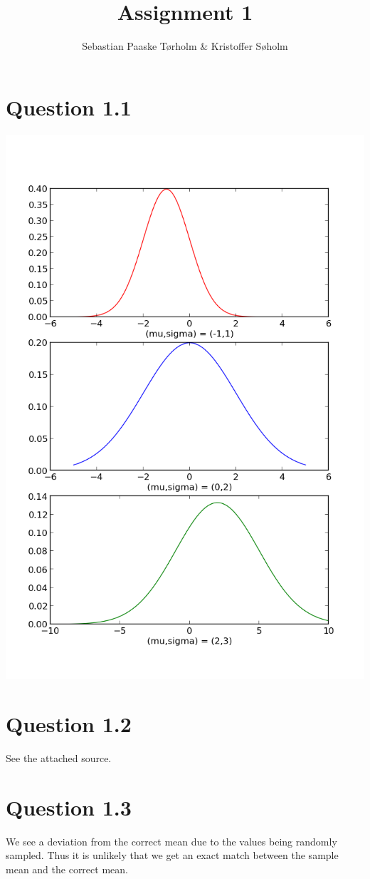 \documentclass[11pt,a4paper]{article}
\title{Assignment 1}
\author{Sebastian Paaske Tørholm \& Kristoffer Søholm}
\begin{document}
\maketitle

\section{Question 1.1}
\includegraphics[width=1.1\textwidth]{figure_1.png}
\section{Question 1.2}
See the attached source.
\section{Question 1.3}
We see a deviation from the correct mean due to the values being randomly sampled. Thus it
is unlikely that we get an exact match between the sample mean and the correct mean.
\end{document}
